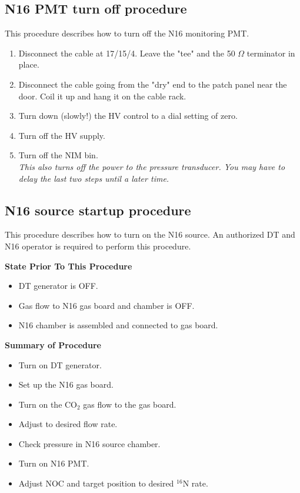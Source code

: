 \subsection{ N16 PMT turn off procedure}

This procedure describes how to turn off the N16 monitoring PMT.
\begin{enumerate}
\item \CheckBox[name=n16pof1]{} Disconnect the cable at 17/15/4. Leave
  the "tee" and the 50 $\Omega$ terminator in place.
\item \CheckBox[name=n16pof2]{} Disconnect the cable going from the "dry" end to the patch panel near the door. Coil it up and hang it on the cable rack.
\item \CheckBox[name=n16pof3]{} Turn down (slowly!) the HV control to a dial setting of zero.
\item \CheckBox[name=n16pof4]{} Turn off the HV supply.
\item \CheckBox[name=n16pof5]{} Turn off the NIM bin.\\ {\it This also turns off the power to the pressure transducer. You may have to delay the last two steps until a later time.}
\end{enumerate}

\pagebreak
\subsection{ N16 source startup procedure}

This procedure describes how to turn on the N16 source. An authorized DT and N16 operator is required to perform this procedure.

{\bf State Prior To This Procedure}
\begin{itemize}
\item \CheckBox[name=sspp1]{} DT generator is OFF.
\item \CheckBox[name=sspp2]{} Gas flow to N16 gas board and chamber is OFF.
\item \CheckBox[name=sspp3]{} N16 chamber is assembled and connected to gas board.
\end{itemize}

{\bf Summary of Procedure}
\begin{itemize}
\item \CheckBox[name=sopn161]{} Turn on DT generator.
\item \CheckBox[name=sopn162]{} Set up the N16 gas board.
\item \CheckBox[name=sopn163]{} Turn on the CO$_2$ gas flow to the gas board.
\item \CheckBox[name=sopn164]{} Adjust to desired flow rate.
\item \CheckBox[name=sopn165]{} Check pressure in N16 source chamber.
\item \CheckBox[name=sopn166]{} Turn on N16 PMT.
\item \CheckBox[name=sopn167]{} Adjust NOC and target position to desired $^{16}$N rate.
\end{itemize}

